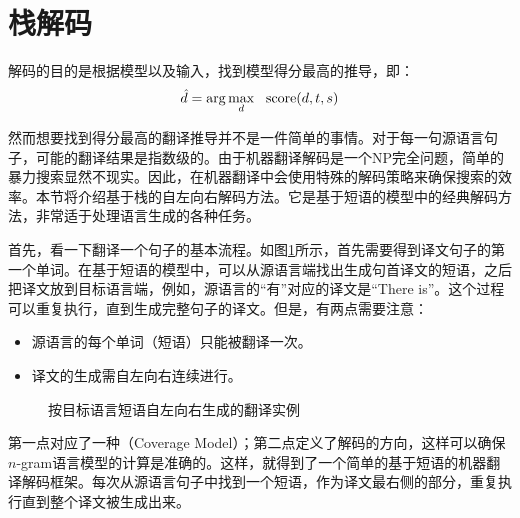 
\sectionnewpage
\section{栈解码}

\parinterval 解码的目的是根据模型以及输入，找到模型得分最高的推导，即：
\begin{eqnarray}
\hat{d} = \arg\max_{d}\ \ \textrm{score}(d,{t},{s})
\label{eq:7-21}
\end{eqnarray}

\parinterval 然而想要找到得分最高的翻译推导并不是一件简单的事情。对于每一句源语言句子，可能的翻译结果是指数级的。由于机器翻译解码是一个NP完全问题，简单的暴力搜索显然不现实。因此，在机器翻译中会使用特殊的解码策略来确保搜索的效率。本节将介绍基于栈的自左向右解码方法。它是基于短语的模型中的经典解码方法，非常适于处理语言生成的各种任务。

\parinterval 首先，看一下翻译一个句子的基本流程。如图\ref{fig:7-26}所示，首先需要得到译文句子的第一个单词。在基于短语的模型中，可以从源语言端找出生成句首译文的短语，之后把译文放到目标语言端，例如，源语言的“有”对应的译文是“There is”。这个过程可以重复执行，直到生成完整句子的译文。但是，有两点需要注意：

\begin{itemize}
\vspace{0.5em}
\item 源语言的每个单词（短语）只能被翻译一次。
\vspace{0.5em}
\item 译文的生成需自左向右连续进行。
\vspace{0.5em}
\end{itemize}

\begin{figure}[htp]
\centering

\caption{按目标语言短语自左向右生成的翻译实例}
\label{fig:7-26}
\end{figure}

\parinterval 第一点对应了一种{\small{}}（Coverage Model）；第二点定义了解码的方向，这样可以确保$n$-gram语言模型的计算是准确的。这样，就得到了一个简单的基于短语的机器翻译解码框架。每次从源语言句子中找到一个短语，作为译文最右侧的部分，重复执行直到整个译文被生成出来。

